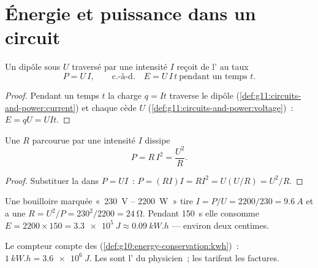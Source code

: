 \section{Énergie et puissance dans un circuit}

\begin{proposition}\label{prop:g11:circuits-and-power:power}
Un dipôle sous  $U$ traversé par une
intensité $I$ reçoit de l' au taux
\[ P = U\,I , \qquad\text{c.-à-d.}\quad E = U\,I\,t \ \text{pendant un temps } t . \]
\end{proposition}

\begin{proof}
Pendant un temps $t$ la charge $q = It$ traverse le dipôle
(\cref{def:g11:circuits-and-power:current}) et chaque
 cède $U$
(\cref{def:g11:circuits-and-power:voltage})~: $E = qU = UIt$.
\end{proof}

\begin{proposition}\label{prop:g11:circuits-and-power:ri2}
Une  $R$ parcourue par une intensité $I$ dissipe
\[ P = R\,I^2 = \frac{U^2}{R} . \]
\end{proposition}

\begin{proof}
Substituer la  dans $P = UI$~:
$P = (RI)I = RI^2 = U(U/R) = U^2/R$.
\end{proof}

\begin{example}\label{ex:g11:circuits-and-power:nameplate}
Une bouilloire marquée «~\qty{230}{V} -- \qty{2200}{W}~» tire
$I = P/U = 2200/230 = \qty{9.6}{A}$ et a une
 $R = U^2/P = 230^2/2200 =
\qty{24}{\ohm}$. Pendant \qty{150}{s} elle consomme $E = 2200 \times 150
= \qty{3.3e5}{J} \approx \qty{0.09}{kW.h}$ --- environ deux centimes.
\end{example}

\begin{remark}\label{rem:g11:circuits-and-power:kwh}
Le compteur compte des 
(\cref{def:g10:energy-conservation:kwh})~: $\qty{1}{kW.h} =
\qty{3.6e6}{J}$. Les  sont l' du
physicien~; les  tarifent les
factures.
\end{remark}

